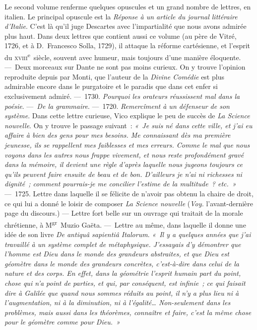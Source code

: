 \documentclass[french,twoside]{book} %
\begin{document}
\par
Le second volume renferme quelques opuscules et un grand nombre de lettres, en italien. Le principal opuscule est la {\itshape Réponse à un article du journal littéraire d’Italie}. C’est là qu’il juge Descartes avec l’impartialité que nous avons admirée plus haut. Dans deux lettres que contient aussi ce volume (au père de Vitré, 1726, et à D. Francesco Solla, 1729), il attaque la réforme cartésienne, et l’esprit du \textsc{xviii}\textsuperscript{e} siècle, souvent avec humeur, mais toujours d’une manière éloquente. — Deux morceaux sur Dante ne sont pas moins curieux. On y trouve l’opinion reproduite depuis par Monti, que l’auteur de la {\itshape Divine Comédie} est plus admirable encore dans le purgatoire et le paradis que dans cet enfer si exclusivement admiré. — 1730. {\itshape Pourquoi les orateurs réussissent mal dans la poésie}. — {\itshape De la grammaire}. — 1720. {\itshape Remercîment à un défenseur de son système}. Dans cette lettre curieuse, Vico explique le peu de succès de {\itshape La Science nouvelle}. On y trouve le passage suivant : \emph{« Je suis né dans cette ville, et j’ai eu affaire à bien des gens pour mes besoins. Me connaissant dès ma première jeunesse, ils se rappellent mes faiblesses et mes erreurs. Comme le mal que nous  voyons dans les autres nous frappe vivement, et nous reste profondément gravé dans la mémoire, il devient une règle d’après laquelle nous jugeons toujours ce qu’ils peuvent faire ensuite de beau et de bon. D’ailleurs je n’ai ni richesses ni dignité ; comment pourrais-je me concilier l’estime de la multitude ? etc. »} — 1725. Lettre dans laquelle il se félicite de n’avoir pas obtenu la chaire de droit, ce qui lui a donné le loisir de composer {\itshape La Science nouvelle} ({\itshape Voy.} l’avant-dernière page du discours.) — Lettre fort belle sur un ouvrage qui traitait de la morale chrétienne, à M\textsuperscript{gr} Muzio Gaëta. — Lettre au même, dans laquelle il donne une idée de son livre {\itshape De antiquâ sapientiâ Italorum}. \emph{« Il y a quelques années que j’ai travaillé à un système complet de métaphysique. J’essayais d’y démontrer que l’homme est Dieu dans le monde des grandeurs abstraites, et que Dieu est géomètre dans le monde des grandeurs concrètes, c’est-à-dire dans celui de la nature et des corps. En effet, dans la géométrie l’esprit humain part du point, chose qui n’a point de parties, et qui, par conséquent, est infinie ; ce qui faisait dire à Galilée que quand nous sommes réduits au point, il n’y a plus lieu ni à l’augmentation, ni à la diminution, ni à l’égalité… Non-seulement dans les problèmes, mais aussi dans les théorèmes, connaître et faire, c’est la même chose pour le géomètre comme pour Dieu. »}\par
\end{document}
